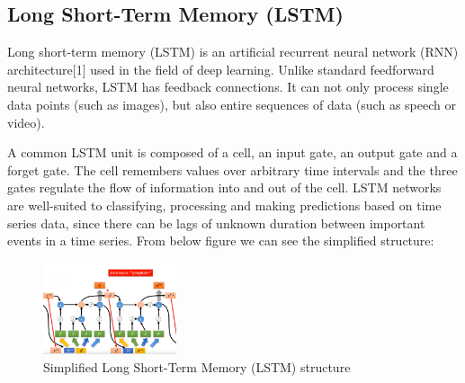 \usepackage{fancyhdr}\documentclass[conference]{IEEEtran}
\begin{document}
\subsection{Long Short-Term Memory (LSTM)}

Long short-term memory (LSTM) is an artificial recurrent neural network (RNN) architecture[1] used in the field of deep learning. Unlike standard feedforward neural networks, LSTM has feedback connections. It can not only process single data points (such as images), but also entire sequences of data (such as speech or video).  

A common LSTM unit is composed of a cell, an input gate, an output gate and a forget gate. The cell remembers values over arbitrary time intervals and the three gates regulate the flow of information into and out of the cell. LSTM networks are well-suited to classifying, processing and making predictions based on time series data, since there can be lags of unknown duration between important events in a time series. From below figure we can see the simplified structure: 


\begin{figure}[htpb]
\begin{center}
\includegraphics[width=0.35\textwidth]{LSTM_source/LSTM_1.PNG}
\vspace{-0.2cm}
\caption{Simplified Long Short-Term Memory (LSTM) structure \cite{12}}
\label{fig_bar}
\end{center}
\vspace{-0.4cm}
\end{figure}
\end{document}
